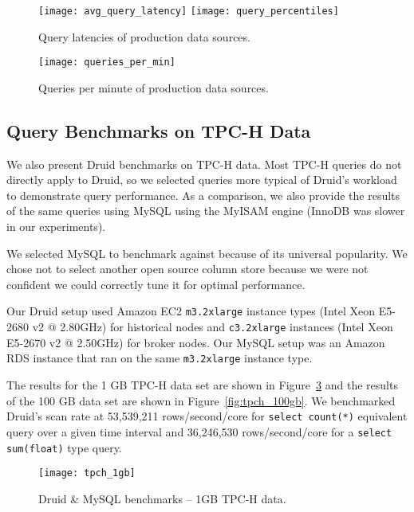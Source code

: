 \documentclass{sig-alternate-2013}
\begin{document}
\begin{figure}
\centering
\texttt{[image: avg\_query\_latency]}
\texttt{[image: query\_percentiles]}
\caption{Query latencies of production data sources.}
\label{fig:query_latency}
\end{figure}

\begin{figure}
\centering
\texttt{[image: queries\_per\_min]}
\caption{Queries per minute of production data sources.}
\label{fig:queries_per_min}
\end{figure}

\subsection{Query Benchmarks on TPC-H Data}
We also present Druid benchmarks on TPC-H data.
Most TPC-H queries do not directly apply to Druid, so we
selected queries more typical of Druid's workload to demonstrate query performance. As a
comparison, we also provide the results of the same queries using MySQL using the
MyISAM engine (InnoDB was slower in our experiments).

We selected MySQL to benchmark
against because of its universal popularity. We chose not to select another
open source column store because we were not confident we could correctly tune
it for optimal performance.

Our Druid setup used Amazon EC2
\texttt{m3.2xlarge} instance types (Intel\textsuperscript{\textregistered} Xeon\textsuperscript{\textregistered} E5-2680 v2 @ 2.80GHz) for
historical nodes and \texttt{c3.2xlarge} instances (Intel\textsuperscript{\textregistered} Xeon\textsuperscript{\textregistered} E5-2670 v2 @ 2.50GHz) for broker
nodes. Our MySQL setup was an Amazon RDS instance that ran on the same \texttt{m3.2xlarge} instance type.

The results for the 1 GB TPC-H data set are shown
in Figure~\ref{fig:tpch_1gb} and the results of the 100 GB data set are shown
in Figure~\ref{fig:tpch_100gb}. We benchmarked Druid's scan rate at
53,539,211 rows/second/core for \texttt{select count(*)} equivalent query over a given time interval
and 36,246,530 rows/second/core for a \texttt{select sum(float)} type query.

\begin{figure}
\centering
\texttt{[image: tpch\_1gb]}
\caption{Druid \& MySQL benchmarks -- 1GB TPC-H data.}
\label{fig:tpch_1gb}
\end{figure}
\end{document}
